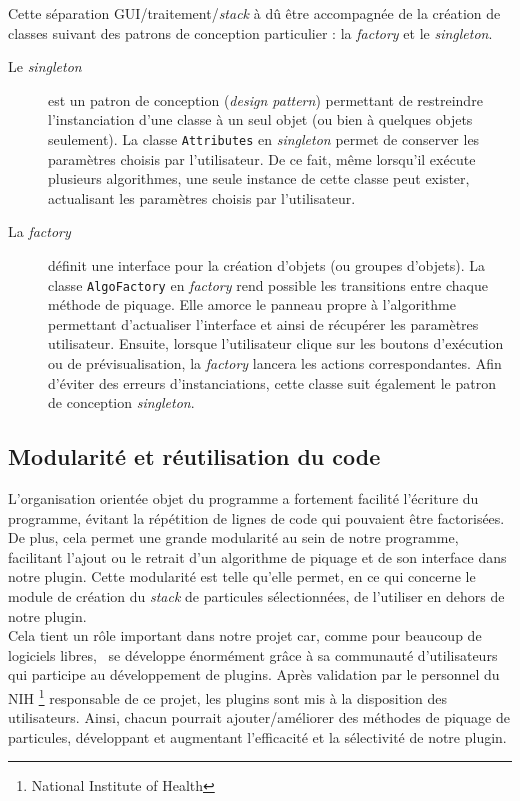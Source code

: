 Cette séparation GUI/traitement/\textit{stack} à dû être accompagnée de la création de classes suivant des patrons de conception particulier : la \emph{factory} et le \emph{singleton}. 
\begin{description}
\item [Le \emph{singleton}] est un patron de conception (\textit{design pattern}) permettant de restreindre l'instanciation d'une classe à un seul objet (ou bien à quelques objets seulement). La classe \texttt{Attributes} en \emph{singleton} permet de conserver les paramètres choisis par l'utilisateur. De ce fait, même lorsqu'il exécute plusieurs algorithmes, une seule instance de cette classe peut exister, actualisant les paramètres choisis par l'utilisateur.
\item[La \emph{factory}] définit une interface pour la création d'objets (ou groupes d'objets). La classe \texttt{AlgoFactory} en \emph{factory} rend possible les transitions entre chaque méthode de piquage. Elle amorce le panneau propre à l'algorithme permettant d'actualiser l'interface et ainsi de récupérer les paramètres utilisateur. Ensuite, lorsque l'utilisateur clique sur les boutons d'exécution ou de prévisualisation, la \emph{factory} lancera les actions correspondantes. Afin d'éviter des erreurs d'instanciations, cette classe suit également le patron de conception \emph{singleton}.
\end{description}

\subsection{Modularité et réutilisation du code}

L'organisation orientée objet du programme a fortement facilité l'écriture du programme, évitant la répétition de lignes de code qui pouvaient \^etre factorisées. De plus, cela permet une grande modularité au sein de notre programme, facilitant l'ajout ou le retrait d'un algorithme de piquage et de son interface dans notre plugin. Cette modularité est telle qu'elle permet, en ce qui concerne le module de création du \textit{stack} de particules sélectionnées, de l'utiliser en dehors de notre plugin.\\
Cela tient un rôle important dans notre projet car, comme pour beaucoup de logiciels libres, \imj ~se développe énormément gr\^ace à sa communauté d'utilisateurs qui participe au développement de plugins. Après validation par le personnel du NIH \footnote{National Institute of Health} responsable de ce projet, les plugins sont mis à la disposition des utilisateurs. Ainsi, chacun pourrait ajouter/améliorer des méthodes de piquage de particules, développant et augmentant l'efficacité et la sélectivité de notre plugin. \\

